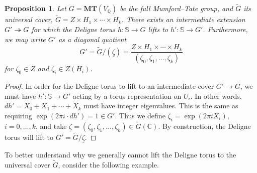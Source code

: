\documentclass[12pt]{amsart}
\newcommand{\Q}{\mathbb{Q}}
\newcommand{\C}{\mathbb{C}}
\newcommand{\wt}{\widetilde}
\newtheorem{proposition}[theorem]{Proposition}
\theoremstyle{definition}
\numberwithin{equation}{section}
\begin{document}
\begin{proposition}
    Let \(G = \mathbf{MT}(V_\Q)\) be the full Mumford--Tate group, and \(\wt{G}\) its 
    universal cover, \(\wt{G} = Z \times H_1 \times \cdots \times H_k\). 
    There exists an intermediate extension \(G' \twoheadrightarrow G\) 
    for which the Deligne torus \(h: \mathbb{S} \to G\) lifts to 
    \(h': \mathbb{S} \to G'\). Furthermore, we may write \(G'\) as a diagonal quotient
    \[G' = \wt{G}/(\underline{\zeta}) = 
        \frac{Z \times H_1 \times \cdots \times H_k}{(\zeta_0, \zeta_1, \dots, \zeta_k)}\] 
    for \(\zeta_0 \in Z\) and \(\zeta_i \in Z(H_i)\). 
\end{proposition}

\begin{proof}

In order for the Deligne torus to lift to an intermediate cover \(G' \to G\), 
we must have \(h': \mathbb{S} \to G'\) acting by a torus representation on \(U_i\).
In other words, \(dh' = X_0 + X_1 + \cdots + X_k\) must have integer eigenvalues.
This is the same as requiring \(\exp(2\pi i\cdot dh') = 1 \in G'\).
Thus we define \(\zeta_i = \exp(2\pi i X_i)\), \(i = 0, \dots, k\), and 
take \(\underline{\zeta} = (\zeta_0, \zeta_1, \dots, \zeta_k) \in \wt{G}(\C)\). 
By construction, the Deligne torus will lift to \(G' = \wt{G}/\underline{\zeta}\).
\end{proof}

To better understand why we generally cannot lift the Deligne torus to the universal 
cover \(\wt{G}\), consider the following example.
\end{document}
